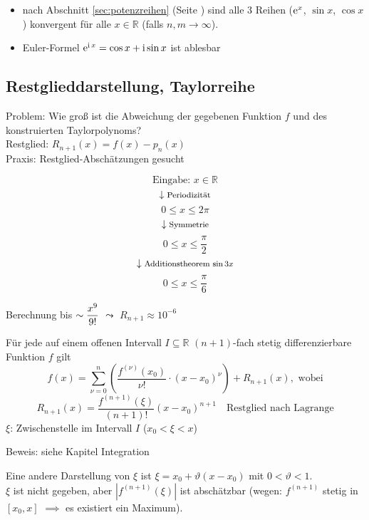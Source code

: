 \begin{note}
  \begin{itemize}
    \item nach Abschnitt \ref{sec:potenzreihen} (Seite \pageref{sec:potenzreihen}) sind alle 3 Reihen ($\operatorname{e}^x$, $\sin x$, $\cos x$) konvergent für alle $x \in \mathbb{R}$ (falls $n, m \rightarrow \infty$).
    \item Euler-Formel $\operatorname{e}^{\operatorname{i} x} = \cos x + \operatorname{i} \sin x$ ist ablesbar
  \end{itemize}
\end{note}

\subsection{Restglieddarstellung, Taylorreihe}
\label{sub:Restglieddarstellung}

Problem: Wie groß ist die Abweichung der gegebenen Funktion $f$ und des konstruierten Taylorpolynoms?\\
Restglied: $R_{n+1}(x) = f(x) - p_n(x)$\\
Praxis: Restglied-Abschätzungen gesucht
%
\begin{example}
  \[ \text{Eingabe: } x \in \mathbb{R} \]
  \[ \downarrow \text{\footnotesize Periodizität} \]
  \[ 0 \leq x \leq 2 \pi \]
  \[ \downarrow \text{\footnotesize Symmetrie} \]
  \[ 0 \leq x \leq \frac \pi 2 \]
  \[ \downarrow \text{\footnotesize Additionstheorem $\sin 3x$} \]
  \[ 0 \leq x \leq \frac \pi 6 \]
  \begin{center} Berechnung bis $\sim\displaystyle \frac{x^9}{9!}$ $\leadsto$ $R_{n+1} \approx 10^{-6}$ \end{center}
\end{example}

\begin{theorem}[Taylorformel]
  Für jede auf einem offenen Intervall $I \subseteq \mathbb{R}$ $(n+1)$-fach stetig differenzierbare Funktion $f$ gilt
  \[ f(x) = \sum_{\nu = 0}^n \left( \frac{f^{(\nu)}(x_0)}{\nu !} \cdot (x - x_0)^\nu \right) + R_{n+1}(x), \text{ wobei}\]
  \[ R_{n+1}(x) = \frac{f^{(n+1)}(\xi)}{(n+1)!} (x-x_0)^{n+1} \quad\text{Restglied nach Lagrange}\]
  $\xi$: Zwischenstelle im Intervall $I$ ($x_0 < \xi < x$)
\end{theorem}

\noindent Beweis: siehe Kapitel Integration

\begin{note}
  Eine andere Darstellung von $\xi$ ist $\xi = x_0 + \vartheta (x - x_0)$ mit $0 < \vartheta < 1$.\\
  $\xi$ ist nicht gegeben, aber $\left| f^{(n+1)}(\xi)\right|$ ist abschätzbar (wegen: $f^{(n+1)}$ stetig in $[x_0,x]$ $\implies$ es existiert ein Maximum).
\end{note}


